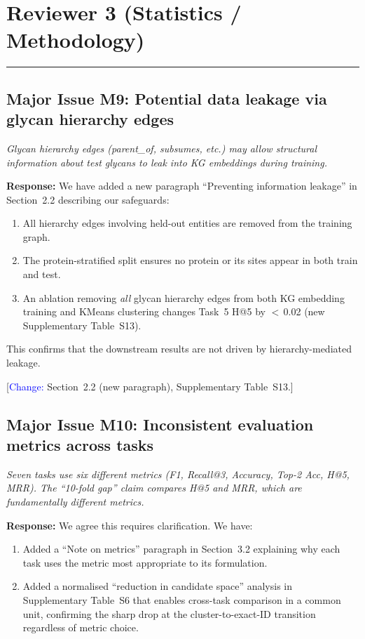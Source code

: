 \documentclass[11pt,a4paper]{article}
\newcommand{\reviewercomment}[1]{\textit{\color{black!70}#1}}
\newcommand{\response}[1]{\textbf{Response:} #1}
\newcommand{\change}[1]{[\textcolor{blue}{Change:} #1]}
\begin{document}
\section*{Reviewer 3 (Statistics / Methodology)}
\noindent\rule{\linewidth}{0.4pt}

\subsection*{Major Issue M9: Potential data leakage via glycan hierarchy edges}

\reviewercomment{Glycan hierarchy edges (parent\_of, subsumes, etc.) may allow
structural information about test glycans to leak into KG embeddings during
training.}

\response{We have added a new paragraph ``Preventing information leakage'' in
Section~2.2 describing our safeguards:
\begin{enumerate}[nosep]
  \item All hierarchy edges involving held-out entities are removed from the
        training graph.
  \item The protein-stratified split ensures no protein or its sites appear in
        both train and test.
  \item An ablation removing \textit{all} glycan hierarchy edges from both KG
        embedding training and KMeans clustering changes Task~5 H@5 by
        $<$\,0.02 (new Supplementary Table~S13).
\end{enumerate}
This confirms that the downstream results are not driven by hierarchy-mediated
leakage.}

\change{Section~2.2 (new paragraph), Supplementary Table~S13.}

\subsection*{Major Issue M10: Inconsistent evaluation metrics across tasks}

\reviewercomment{Seven tasks use six different metrics (F1, Recall@3, Accuracy,
Top-2 Acc, H@5, MRR). The ``10-fold gap'' claim compares H@5 and MRR, which
are fundamentally different metrics.}

\response{We agree this requires clarification. We have:
\begin{enumerate}[nosep]
  \item Added a ``Note on metrics'' paragraph in Section~3.2 explaining why
        each task uses the metric most appropriate to its formulation.
  \item Added a normalised ``reduction in candidate space'' analysis in
        Supplementary Table~S6 that enables cross-task comparison in a common
        unit, confirming the sharp drop at the cluster-to-exact-ID transition
        regardless of metric choice.
\end{enumerate}}
\end{document}

